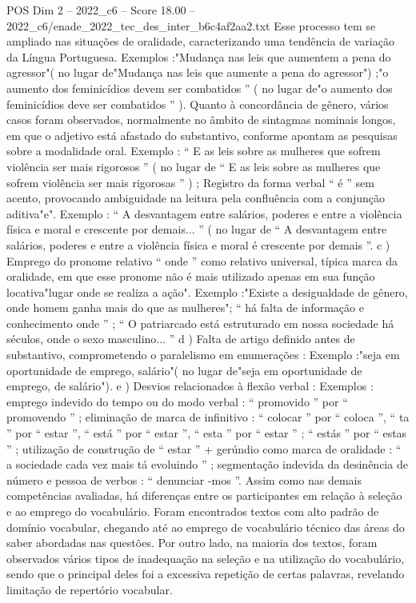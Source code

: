 \begin{textsample}{POS Dim 2 – 2022\_c6 – Score 18.00 – 2022\_c6/enade\_2022\_tec\_des\_inter\_b6c4af2aa2.txt}
Esse processo tem se ampliado nas situações de oralidade, caracterizando uma tendência de variação da Língua Portuguesa.
Exemplos :"Mudança nas leis que aumentem a pena do agressor"( no lugar de"Mudança nas leis que aumente a pena do agressor") ;"o aumento dos feminicídios devem ser combatidos ” ( no lugar de"o aumento dos feminicídios deve ser combatidos ” ).
Quanto à concordância de gênero, vários casos foram observados, normalmente no âmbito de sintagmas nominais longos, em que o adjetivo está afastado do substantivo, conforme apontam as pesquisas sobre a modalidade oral.
Exemplo : “ E as leis sobre as mulheres que sofrem violência ser mais rigorosos ” ( no lugar de “ E as leis sobre as mulheres que sofrem violência ser mais rigorosas ” ) ; Registro da forma verbal “ é ” sem acento, provocando ambiguidade na leitura pela confluência com a conjunção aditiva"e".
Exemplo : “ A desvantagem entre salários, poderes e entre a violência física e moral e crescente por demais... ” ( no lugar de “ A desvantagem entre salários, poderes e entre a violência física e moral é crescente por demais ”. c ) Emprego do pronome relativo “ onde ” como relativo universal, típica marca da oralidade, em que esse pronome não é mais utilizado apenas em sua função locativa"lugar onde se realiza a ação".
Exemplo :"Existe a desigualdade de gênero, onde homem ganha mais do que as mulheres"; “ há falta de informação e conhecimento onde ” ; “ O patriarcado está estruturado em nossa sociedade há séculos, onde o sexo masculino... ” d ) Falta de artigo definido antes de substantivo, comprometendo o paralelismo em enumerações : Exemplo :"seja em oportunidade de emprego, salário"( no lugar de"seja em oportunidade de emprego, de salário"). e ) Desvios relacionados à flexão verbal : Exemplos : emprego indevido do tempo ou do modo verbal : “ promovido ” por “ promovendo ” ; eliminação de marca de infinitivo : “ colocar ” por “ coloca ”, “ ta ” por “ estar ”, “ está ” por “ estar ”, “ esta ” por “ estar ” ; “ estás ” por “ estas ” ; utilização de construção de “ estar ” + gerúndio como marca de oralidade : “ a sociedade cada vez mais tá evoluindo ” ; segmentação indevida da desinência de número e pessoa de verbos : “ denunciar -mos ”.
Assim como nas demais competências avaliadas, há diferenças entre os participantes em relação à seleção e ao emprego do vocabulário.
Foram encontrados textos com alto padrão de domínio vocabular, chegando até ao emprego de vocabulário técnico das áreas do saber abordadas nas questões.
Por outro lado, na maioria dos textos, foram observados vários tipos de inadequação na seleção e na utilização do vocabulário, sendo que o principal deles foi a excessiva repetição de certas palavras, revelando limitação de repertório vocabular.

\end{textsample}
